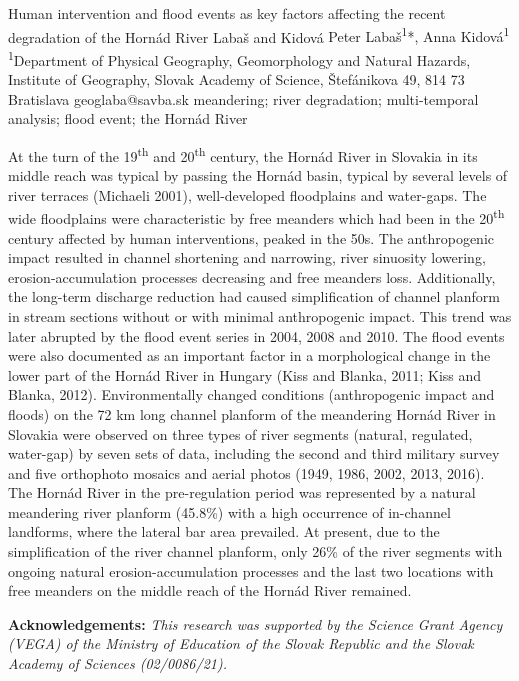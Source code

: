 \abstract
{Human intervention and flood events as key factors affecting the recent degradation of the Hornád River} 
{Labaš and Kidová} 
{Peter Labaš\textsuperscript{1}*, Anna Kidová\textsuperscript{1}} 
{\TLtag} 
{
\textsuperscript{1}Department of Physical Geography, Geomorphology and Natural Hazards, Institute of Geography, Slovak Academy of Science, Štefánikova 49, 814 73 Bratislava
}
{geoglaba@savba.sk}  %
{meandering; river degradation; multi-temporal analysis; flood event; the Hornád River}
{At the turn of the 19\textsuperscript{th} and 20\textsuperscript{th} century, the Hornád River in Slovakia in its middle reach was typical by passing the Hornád basin, typical by several levels of river terraces (Michaeli 2001), well-developed floodplains and water-gaps. The wide floodplains were characteristic by free meanders which had been in the 20\textsuperscript{th} century affected by human interventions, peaked in the 50s. The anthropogenic impact resulted in channel shortening and narrowing, river sinuosity lowering, erosion-accumulation processes decreasing and free meanders loss. Additionally, the long-term discharge reduction had caused simplification of channel planform in stream sections without or with minimal anthropogenic impact. This trend was later abrupted by the flood event series in 2004, 2008 and 2010. The flood events were also documented as an important factor in a morphological change in the lower part of the Hornád River in Hungary (Kiss and Blanka, 2011; Kiss and Blanka, 2012). Environmentally changed conditions (anthropogenic impact and floods) on the 72 km long channel planform of the meandering Hornád River in Slovakia were observed on three types of river segments (natural, regulated, water-gap) by seven sets of data, including the second and third military survey and five orthophoto mosaics and aerial photos (1949, 1986, 2002, 2013, 2016). The Hornád River in the pre-regulation period was represented by a natural meandering river planform (45.8\%) with a high occurrence of in-channel landforms, where the lateral bar area prevailed. At present, due to the simplification of the river channel planform, only 26\% of the river segments with ongoing natural erosion-accumulation processes and the last two locations with free meanders on the middle reach of the Hornád River remained.

\vspace{0.5em}
\noindent
\textbf{Acknowledgements:}
\textit{This research was supported by the Science Grant Agency (VEGA) of the Ministry of Education of the Slovak Republic and the Slovak Academy of Sciences (02/0086/21).}
}
